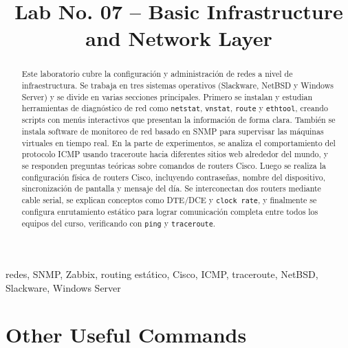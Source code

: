 \documentclass[conference]{IEEEtran}
\begin{document}
\title{Lab No. 07 -- Basic Infrastructure and Network Layer}

\author{
    \and
    \and
}

\maketitle

\begin{abstract}
Este laboratorio cubre la configuración y administración de redes a nivel de infraestructura.
Se trabaja en tres sistemas operativos (Slackware, NetBSD y Windows Server) y se divide en
varias secciones principales. Primero se instalan y estudian herramientas de diagnóstico de red
como \texttt{netstat}, \texttt{vnstat}, \texttt{route} y \texttt{ethtool}, creando scripts con
menús interactivos que presentan la información de forma clara. También se instala software de
monitoreo de red basado en SNMP para supervisar las máquinas virtuales en tiempo real. En la
parte de experimentos, se analiza el comportamiento del protocolo ICMP usando traceroute hacia
diferentes sitios web alrededor del mundo, y se responden preguntas teóricas sobre comandos de
routers Cisco. Luego se realiza la configuración física de routers Cisco, incluyendo contraseñas,
nombre del dispositivo, sincronización de pantalla y mensaje del día. Se interconectan dos routers
mediante cable serial, se explican conceptos como DTE/DCE y \texttt{clock rate}, y finalmente se
configura enrutamiento estático para lograr comunicación completa entre todos los equipos del
curso, verificando con \texttt{ping} y \texttt{traceroute}.
\end{abstract}

\begin{IEEEkeywords}
redes, SNMP, Zabbix, routing estático, Cisco, ICMP, traceroute, NetBSD, Slackware, Windows Server
\end{IEEEkeywords}


\section{Other Useful Commands}
\end{document}
